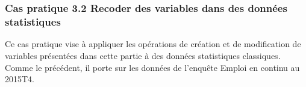 \documentclass[12pt,twosided, notitlepage]{book}
\begin{document}
~

~

\subsubsection{\texorpdfstring{\textbf{Cas pratique 3.2} Recoder des
variables dans des données
statistiques}{Cas pratique 3.2 Recoder des variables dans des données statistiques}}\label{cas-pratique-3.2-recoder-des-variables-dans-des-donnees-statistiques}


Ce cas pratique vise à appliquer les opérations de création et de
modification de variables présentées dans cette partie à des données
statistiques classiques. Comme le précédent, il porte sur les données de
l'enquête Emploi en continu au 2015T4.
\end{document}
